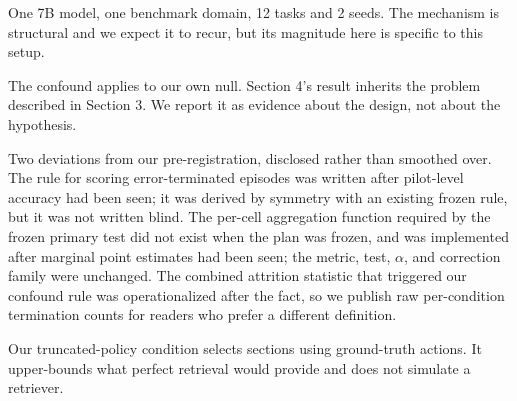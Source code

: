 \documentclass{article}
\begin{document}
One 7B model, one benchmark domain, 12 tasks and 2 seeds. The mechanism is structural
and we expect it to recur, but its magnitude here is specific to this setup.

The confound applies to our own null. Section 4's result inherits the problem described
in Section 3. We report it as evidence about the design, not about the hypothesis.

Two deviations from our pre-registration, disclosed rather than smoothed over. The rule
for scoring error-terminated episodes was written after pilot-level accuracy had been
seen; it was derived by symmetry with an existing frozen rule, but it was not written
blind. The per-cell aggregation function required by the frozen primary test did not
exist when the plan was frozen, and was implemented after marginal point estimates had
been seen; the metric, test, $\alpha$, and correction family were unchanged. The
combined attrition statistic that triggered our confound rule was operationalized after
the fact, so we publish raw per-condition termination counts for readers who prefer a
different definition.

Our truncated-policy condition selects sections using ground-truth actions. It
upper-bounds what perfect retrieval would provide and does not simulate a retriever.
\end{document}
